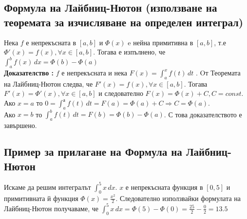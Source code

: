 \documentclass[fleqn,12pt]{article}
\begin{document}
\begin{flushleft}
\subsection{Формула на Лайбниц-Нютон (използване на теоремата за изчисляване на определен интеграл)}
Нека $f$ е непрекъсната в $[a,b]$ и $\Phi(x)$ e нейна примитивна в $[a,b]$, т.е $\Phi'(x)=f(x), \forall x \in [a,b]$. Тогава е изпълнено, че
$\int_{a}^{b} f(x)\,dx = \Phi(b) - \Phi(a)$\\
\textbf{Доказателство :} $f$ е непрекъсната и нека $F(x)=\int_{a}^{x} f(t)\,dt$ . Oт Теоремата на Лайбниц-Нютон следва, че $F'(x)=f(x), \forall x \in [a,b]$.
Тогава $F'(x)=\Phi'(x), \forall x \in [a,b]$ и следователно $F(x) = \Phi(x) + C, C = const$.
Ако $x = a$ то $0 = \int_{a}^{а} f(t)\,dt = F(a) = \Phi(a) + C \Rightarrow C = \Phi(a)$.\\
Ако $x = b$ то $ \int_{a}^{b} f(t)\,dt = F(b) = \Phi(b) - \Phi(a)$. С това доказателството е завършено.

\subsection{Пример за прилагане на Формула на Лайбниц-Нютон}
Искаме да решим интегралът $\int_{0}^{5} x\,dx$. $x$ е непрекъсната функция в $[0,5]$ и примитивната й функция $\Phi(x)=\frac{x^2}{2}$.
Следователно използвайки формулата на Лайбниц-Нютон получаваме, че $\int_{0}^{5} x\,dx = \Phi(5) - \Phi(0) = \frac{25}{2} - \frac{0}{2} = 13.5$

\end{flushleft}
\end{document}
